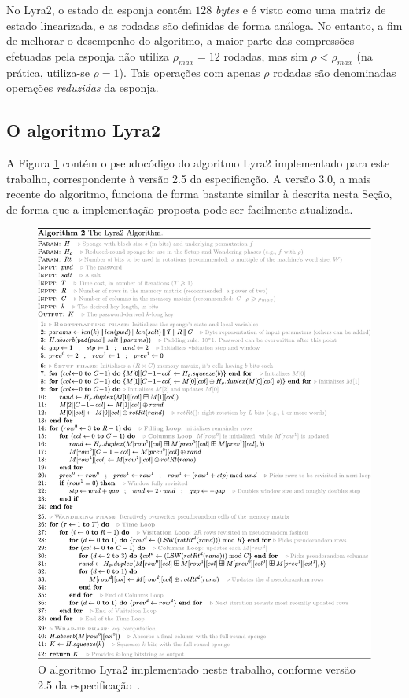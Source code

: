 \documentclass{article}
\begin{document}
No Lyra2, o estado da esponja contém $128$ \emph{bytes} e é visto como uma matriz de
estado linearizada, e as rodadas são definidas de forma análoga. No entanto, a
fim de melhorar o desempenho do algoritmo, a maior parte das compressões
efetuadas pela esponja não utiliza $\rho_{max} = 12$ rodadas, mas sim $\rho <
\rho_{max}$ (na prática, utiliza-se $\rho = 1$). Tais operações com apenas
$\rho$ rodadas são denominadas operações \emph{reduzidas} da esponja.

\subsection{O algoritmo Lyra2 }\label{sec-lyra2-alg}

A Figura \ref{lyra2-alg} contém o pseudocódigo do algoritmo Lyra2 implementado
para este trabalho, correspondente à versão 2.5 da especificação. A versão 3.0,
a mais recente do algoritmo, funciona de forma bastante similar à descrita
nesta Seção, de forma que a implementação proposta pode ser facilmente
atualizada.

\begin{figure}[htbp]
\centering
\includegraphics[width=\linewidth]{./img/spec.pdf}
\caption{O algoritmo Lyra2 implementado neste trabalho\label{lyra2-alg}, conforme versão 2.5 da especificação~\cite{lyra2-spec}.}
\end{figure}
\end{document}
